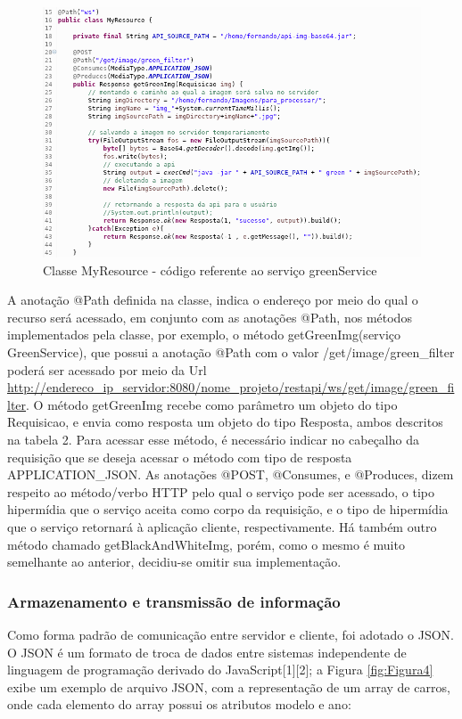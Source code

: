 \documentclass[12pt]{article}
\begin{document}
\begin{figure}[ht]
	\centering
	\includegraphics[width=.9\textwidth]{codigo-green-service.png}
	\caption{Classe MyResource - código referente ao serviço greenService}
	\label{fig:Figura10}
\end{figure}

A anotação @Path definida na classe, indica o endereço por meio do qual o recurso será acessado, em conjunto com as anotações @Path, nos métodos implementados pela classe, por exemplo, o método getGreenImg(serviço GreenService), que possui a anotação @Path com o valor /get/image/green\_filter poderá ser acessado por meio da Url \url{http://endereco_ip_servidor:8080/nome_projeto/restapi/ws/get/image/green_filter}.
 O método getGreenImg recebe como parâmetro um objeto do tipo Requisicao, e envia como resposta um objeto do tipo Resposta, ambos descritos na tabela 2. Para acessar esse método, é necessário indicar no cabeçalho da requisição que se deseja acessar o método com tipo de resposta APPLICATION\_JSON. As anotações @POST, @Consumes, e @Produces, dizem respeito ao método/verbo HTTP pelo qual o serviço pode ser acessado, o tipo hipermídia que o serviço aceita como corpo da requisição, e o tipo de hipermídia que o serviço retornará à aplicação cliente, respectivamente. Há também outro método chamado getBlackAndWhiteImg, porém, como o mesmo é muito semelhante ao anterior, decidiu-se omitir sua implementação.

\subsubsection{Armazenamento e transmissão de informação}

Como forma padrão de comunicação entre servidor e cliente, foi adotado o JSON. O JSON é um formato de troca de dados entre sistemas independente de linguagem de programação derivado do JavaScript[1][2]; a Figura \ref{fig:Figura4} exibe um exemplo de arquivo JSON, com a representação de um array de carros, onde cada elemento do array possui os atributos modelo e ano:
\end{document}
